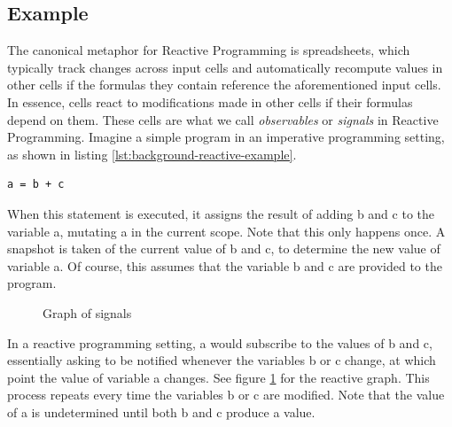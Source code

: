 \subsection{Example}

The canonical metaphor for Reactive Programming is spreadsheets, which typically track changes across input cells and automatically recompute values in other cells if the formulas they contain reference the aforementioned input cells. In essence, cells react to modifications made in other cells if their formulas depend on them. These cells are what we call \textit{observables} or \textit{signals} in Reactive Programming.
Imagine a simple program in an imperative programming setting, as shown in listing \ref{lst:background-reactive-example}.

\begin{lstlisting}[caption={A basic reactive program},captionpos=b,label={lst:background-reactive-example}]
	a = b + c
\end{lstlisting}

When this statement is executed, it assigns the result of adding b and c to the variable a, mutating a in the current scope. Note that this only happens once. A snapshot is taken of the current value of b and c, to determine the new value of variable a. Of course, this assumes that the variable b and c are provided to the program.

\begin{figure}[h]
	\caption{Graph of signals}
	\label{fig:background-reactive-example}
\end{figure}

In a reactive programming setting, a would subscribe to the values of b and c, essentially asking to be notified whenever the variables b or c change, at which point the value of variable a changes. See figure \ref{fig:background-reactive-example} for the reactive graph. This process repeats every time the variables b or c are modified. Note that the value of a is undetermined until both b and c produce a value. 

